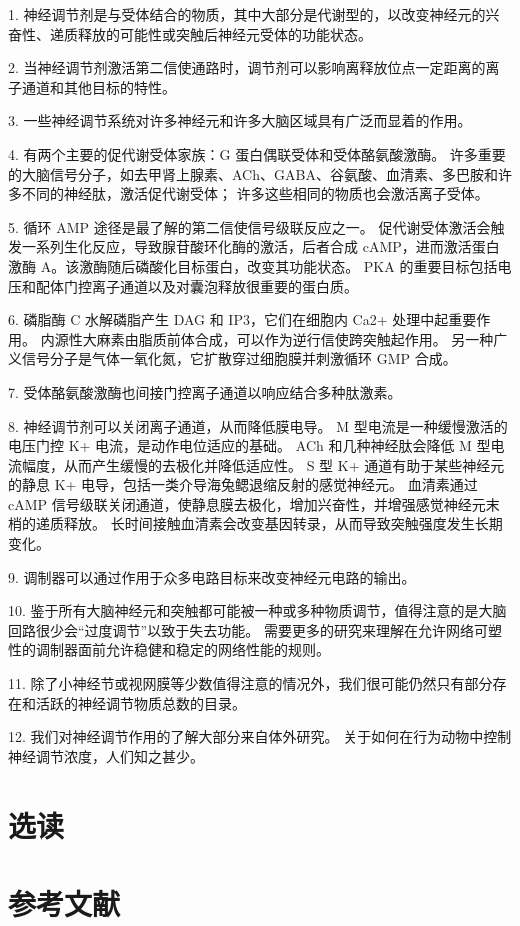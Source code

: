 1. 神经调节剂是与受体结合的物质，其中大部分是代谢型的，以改变神经元的兴奋性、递质释放的可能性或突触后神经元受体的功能状态。 

2. 当神经调节剂激活第二信使通路时，调节剂可以影响离释放位点一定距离的离子通道和其他目标的特性。 

3. 一些神经调节系统对许多神经元和许多大脑区域具有广泛而显着的作用。 

4. 有两个主要的促代谢受体家族：G 蛋白偶联受体和受体酪氨酸激酶。 许多重要的大脑信号分子，如去甲肾上腺素、ACh、GABA、谷氨酸、血清素、多巴胺和许多不同的神经肽，激活促代谢受体； 许多这些相同的物质也会激活离子受体。 

5. 循环 AMP 途径是最了解的第二信使信号级联反应之一。 促代谢受体激活会触发一系列生化反应，导致腺苷酸环化酶的激活，后者合成 cAMP，进而激活蛋白激酶 A。该激酶随后磷酸化目标蛋白，改变其功能状态。 PKA 的重要目标包括电压和配体门控离子通道以及对囊泡释放很重要的蛋白质。 

6. 磷脂酶 C 水解磷脂产生 DAG 和 IP3，它们在细胞内 Ca2+ 处理中起重要作用。 内源性大麻素由脂质前体合成，可以作为逆行信使跨突触起作用。 另一种广义信号分子是气体一氧化氮，它扩散穿过细胞膜并刺激循环 GMP 合成。 

7. 受体酪氨酸激酶也间接门控离子通道以响应结合多种肽激素。 

8. 神经调节剂可以关闭离子通道，从而降低膜电导。 M 型电流是一种缓慢激活的电压门控 K+ 电流，是动作电位适应的基础。 ACh 和几种神经肽会降低 M 型电流幅度，从而产生缓慢的去极化并降低适应性。 S 型 K+ 通道有助于某些神经元的静息 K+ 电导，包括一类介导海兔鳃退缩反射的感觉神经元。 血清素通过 cAMP 信号级联关闭通道，使静息膜去极化，增加兴奋性，并增强感觉神经元末梢的递质释放。 长时间接触血清素会改变基因转录，从而导致突触强度发生长期变化。 

9. 调制器可以通过作用于众多电路目标来改变神经元电路的输出。 

10. 鉴于所有大脑神经元和突触都可能被一种或多种物质调节，值得注意的是大脑回路很少会“过度调节”以致于失去功能。 需要更多的研究来理解在允许网络可塑性的调制器面前允许稳健和稳定的网络性能的规则。 

11. 除了小神经节或视网膜等少数值得注意的情况外，我们很可能仍然只有部分存在和活跃的神经调节物质总数的目录。 

12. 我们对神经调节作用的了解大部分来自体外研究。 关于如何在行为动物中控制神经调节浓度，人们知之甚少。

\section{选读}

\section{参考文献}


